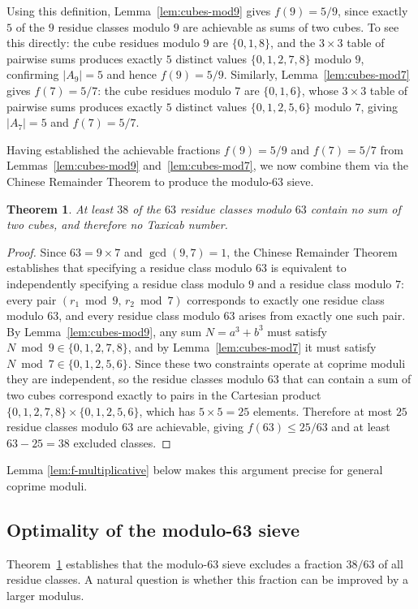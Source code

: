 \documentclass[12pt]{amsart}
\newtheorem{theorem}{Theorem}
\theoremstyle{definition}
\theoremstyle{remark}
\begin{document}
Using this definition, Lemma~\ref{lem:cubes-mod9} gives $f(9) = 5/9$, since
exactly $5$ of the $9$ residue classes modulo $9$ are achievable as sums
of two cubes. To see this directly: the cube residues modulo $9$ are
$\{0, 1, 8\}$, and the $3 \times 3$ table of pairwise sums produces
exactly $5$ distinct values $\{0, 1, 2, 7, 8\}$ modulo $9$, confirming
$|A_9| = 5$ and hence $f(9) = 5/9$. Similarly,
Lemma~\ref{lem:cubes-mod7} gives $f(7) = 5/7$: the cube residues modulo
$7$ are $\{0, 1, 6\}$, whose $3 \times 3$ table of pairwise sums produces
exactly $5$ distinct values $\{0, 1, 2, 5, 6\}$ modulo $7$, giving
$|A_7| = 5$ and $f(7) = 5/7$.
\medskip

Having established the achievable fractions $f(9) = 5/9$ and 
$f(7) = 5/7$ from Lemmas~\ref{lem:cubes-mod9} 
and~\ref{lem:cubes-mod7}, we now combine them via the Chinese 
Remainder Theorem to produce the modulo-$63$ sieve.

\begin{theorem}\label{thm:sieve63}
At least $38$ of the $63$ residue classes modulo $63$ contain no sum 
of two cubes, and therefore no Taxicab number. 
\end{theorem}

\begin{proof}
Since $63 = 9 \times 7$ and $\gcd(9,7) = 1$, the Chinese Remainder 
Theorem establishes that specifying a residue class modulo $63$ is 
equivalent to independently specifying a residue class modulo $9$ and 
a residue class modulo $7$: every pair $(r_1 \bmod 9,\, r_2 \bmod 7)$ 
corresponds to exactly one residue class modulo $63$, and every 
residue class modulo $63$ arises from exactly one such pair. By 
Lemma~\ref{lem:cubes-mod9}, any sum $N = a^3 + b^3$ must satisfy 
$N \bmod 9 \in \{0,1,2,7,8\}$, and by Lemma~\ref{lem:cubes-mod7} it 
must satisfy $N \bmod 7 \in \{0,1,2,5,6\}$. Since these two 
constraints operate at coprime moduli they are independent, so the 
residue classes modulo $63$ that can contain a sum of two cubes 
correspond exactly to pairs in the Cartesian product 
$\{0,1,2,7,8\} \times \{0,1,2,5,6\}$, which has $5 \times 5 = 25$ 
elements. Therefore at most $25$ residue classes modulo $63$ are 
achievable, giving $f(63) \le 25/63$ and at least $63 - 25 = 38$ 
excluded classes. 
\end{proof}

Lemma \ref{lem:f-multiplicative} below makes this argument precise for general coprime moduli.

\subsection{Optimality of the modulo-63 sieve}\label{subsec:optimal}
Theorem~\ref{thm:sieve63} establishes that the modulo-$63$ sieve 
excludes a fraction $38/63$ of all residue classes. A natural question 
is whether this fraction can be improved by a larger 
modulus.
\end{document}
